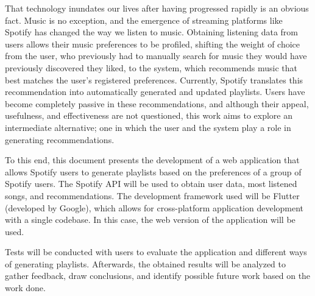 That technology inundates our lives after having progressed rapidly is an obvious fact.
Music is no exception, and the emergence of streaming platforms like Spotify has changed the way we listen to music.
Obtaining listening data from users allows their music preferences to be profiled, shifting the weight of choice 
from the user, who previously had to manually search for music they would have previously 
discovered they liked, to the system, which recommends music 
that best matches the user's registered preferences. Currently, Spotify translates this recommendation into automatically generated and updated playlists.
Users have become completely passive in these recommendations, and
although their appeal, usefulness, and effectiveness are not questioned, this work aims to explore an intermediate alternative; one in which the user and the system
play a role in generating recommendations.

To this end, this document presents the development of a web application that allows Spotify users
to generate playlists based on the preferences of a group of Spotify users. The Spotify API will be used
to obtain user data, most listened songs, and recommendations. The development framework used will be Flutter (developed by Google), which allows for cross-platform application development with a single codebase. In this case, the web version of the application will be used.

Tests will be conducted with users to evaluate the application and different ways of generating playlists. Afterwards, the obtained results will be analyzed to gather feedback, draw conclusions, and identify possible future work based on the work done.

